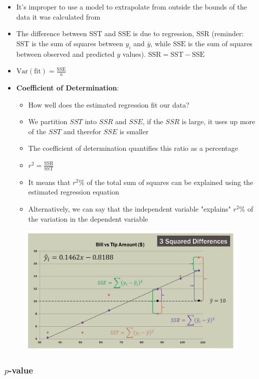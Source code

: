\documentclass{article}
\begin{document}
\begin{itemize}
    \item It's improper to use a model to extrapolate from outside the bounds of the data it was calculated from
    \item The difference between $\text{SST}$ and $\text{SSE}$ is due to regression, $\text{SSR}$ (reminder: $\text{SST}$ is the sum of squares between $y_i$ and $\bar{y}$, while $\text{SSE}$ is the sum of squares between observed and predicted $y$ values). $\text{SSR}=\text{SST}-\text{SSE}$
    \item $\text{Var}(\text{fit})=\frac{\text{SSE}}{n}$
    \item \textbf{Coefficient of Determination}:
    \begin{itemize}
        \item How well does the estimated regression fit our data?
        \item We partition $SST$ into $SSR$ and $SSE$, if the $SSR$ is large, it uses up more of the $SST$ and therefor $SSE$ is smaller
        \item The coefficient of determination quantifies this ratio as a percentage
        \item $r^2=\frac{\text{SSR}}{\text{SST}}$
        \item It means that $r^2$\% of the total sum of squares can be explained using the estimated regression equation
        \item Alternatively, we can say that the independent variable "explains" $r^2$\% of the variation in the dependent variable
    \end{itemize}
\end{itemize}

\begin{figure}[H]
    \centering
    \includegraphics[width=0.5\linewidth]{images/sse_sst_ssr.jpeg}
\end{figure}

\subsubsection{\( p \)-value}
\end{document}
